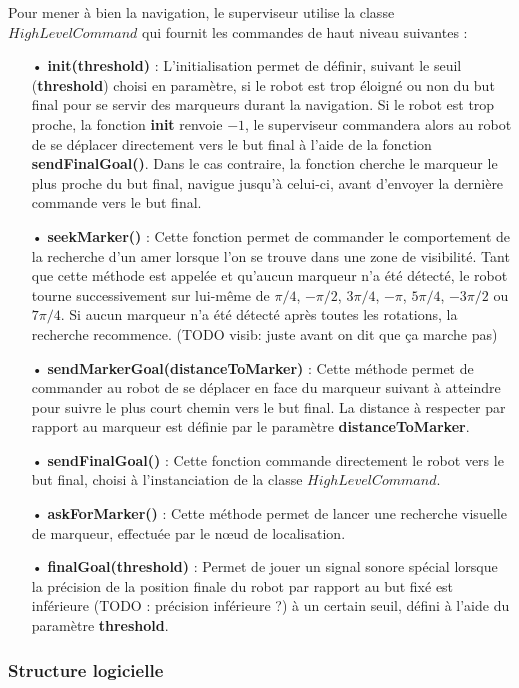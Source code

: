 \documentclass[10pt,a4paper]{article}
\begin{document}
Pour mener à bien la navigation, le superviseur utilise la classe $HighLevelCommand$ qui fournit les commandes de haut niveau suivantes :

\begin{itemize}
\item[•] \textbf{init(threshold)} : L'initialisation permet de définir, suivant le seuil (\textbf{threshold}) choisi en paramètre, si le robot est trop éloigné ou non du but final pour se servir des marqueurs durant la navigation. Si le robot est trop proche, la fonction \textbf{init} renvoie $-1$, le superviseur commandera alors au robot de se déplacer directement vers le but final à l'aide de la fonction \textbf{sendFinalGoal()}. Dans le cas contraire, la fonction cherche le marqueur le plus proche du but final, navigue jusqu'à celui-ci, avant d'envoyer la dernière commande vers le but final.
\item[•] \textbf{seekMarker()} : Cette fonction permet de commander le comportement de la recherche d'un amer lorsque l'on se trouve dans une zone de visibilité. Tant que cette méthode est appelée et qu'aucun marqueur n'a été détecté, le robot tourne successivement sur lui-même de $\pi/4$, $-\pi/2$, $3\pi/4$, $-\pi$, $5\pi/4$, $-3\pi/2$ ou $7\pi/4$. Si aucun marqueur n'a été détecté après toutes les rotations, la recherche recommence. (TODO visib: juste avant on dit que ça marche pas)
\item[•] \textbf{sendMarkerGoal(distanceToMarker)} : Cette méthode permet de commander au robot de se déplacer en face du marqueur suivant à atteindre pour suivre le plus court chemin vers le but final. La distance à respecter par rapport au marqueur est définie par le paramètre \textbf{distanceToMarker}. 
\item[•] \textbf{sendFinalGoal()} : Cette fonction commande directement le robot vers le but final, choisi à l'instanciation de la classe $HighLevelCommand$.
\item[•] \textbf{askForMarker()} :  Cette méthode permet de lancer une recherche visuelle de marqueur, effectuée par le nœud de localisation.
\item[•] \textbf{finalGoal(threshold)} : Permet de jouer un signal sonore spécial lorsque la précision de la position finale du robot par rapport au but fixé est inférieure (TODO : précision inférieure ?) à un certain seuil, défini à l'aide du paramètre \textbf{threshold}.
\end{itemize}

\newpage
\subsubsection{Structure logicielle}
\label{sec:StructureLogicielle}
\end{document}
